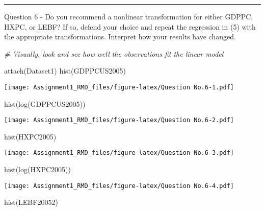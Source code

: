 \documentclass[
]{article}
\newenvironment{Shaded}{\begin{snugshade}}{\end{snugshade}}
\newcommand{\CommentTok}[1]{\textcolor[rgb]{0.56,0.35,0.01}{\textit{#1}}}
\newcommand{\FunctionTok}[1]{\textcolor[rgb]{0.00,0.00,0.00}{#1}}
\newcommand{\NormalTok}[1]{#1}
\begin{document}
\begin{center}\rule{0.5\linewidth}{0.5pt}\end{center}

Question 6 - Do you recommend a nonlinear transformation for either
GDPPC, HXPC, or LEBF? If so, defend your choice and repeat the
regression in (5) with the appropriate transformations. Interpret how
your results have changed.

\begin{Shaded}
\begin{Highlighting}[]
\CommentTok{\# Visually, look and see how well the observations fit the linear model}

\FunctionTok{attach}\NormalTok{(Dataset1)}
\FunctionTok{hist}\NormalTok{(GDPPCUS2005)        }
\end{Highlighting}
\end{Shaded}

\texttt{[image: Assignment1\_RMD\_files/figure-latex/Question No.6-1.pdf]}

\begin{Shaded}
\begin{Highlighting}[]
\FunctionTok{hist}\NormalTok{(}\FunctionTok{log}\NormalTok{(GDPPCUS2005))}
\end{Highlighting}
\end{Shaded}

\texttt{[image: Assignment1\_RMD\_files/figure-latex/Question No.6-2.pdf]}

\begin{Shaded}
\begin{Highlighting}[]
\FunctionTok{hist}\NormalTok{(HXPC2005)}
\end{Highlighting}
\end{Shaded}

\texttt{[image: Assignment1\_RMD\_files/figure-latex/Question No.6-3.pdf]}

\begin{Shaded}
\begin{Highlighting}[]
\FunctionTok{hist}\NormalTok{(}\FunctionTok{log}\NormalTok{(HXPC2005))}
\end{Highlighting}
\end{Shaded}

\texttt{[image: Assignment1\_RMD\_files/figure-latex/Question No.6-4.pdf]}

\begin{Shaded}
\begin{Highlighting}[]
\FunctionTok{hist}\NormalTok{(LEBF20052)}
\end{Highlighting}
\end{Shaded}
\end{document}
